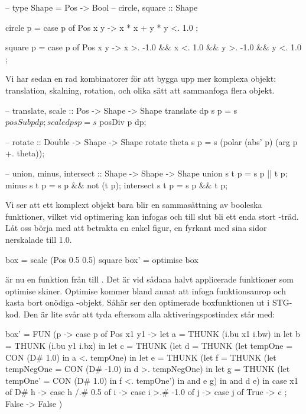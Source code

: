 \documentclass[Rapport]{subfiles}
\begin{document}
\begin{codeEx}
-- type Shape = Pos -> Bool
-- circle, square :: Shape

circle p = case p of
    { Pos x y -> x * x + y * y <. 1.0
    };

square p = case p of
    { Pos x y -> x >. -1.0 && x <. 1.0
              && y >. -1.0 && y <. 1.0
    };
\end{codeEx}

Vi har sedan en rad kombinatorer för att bygga upp mer komplexa objekt:
translation, skalning, rotation, och olika sätt att sammanfoga flera objekt.

\begin{codeEx}
-- translate, scale :: Pos -> Shape -> Shape
translate dp s p = s $ posSub p dp;
scale     dp s p = s $ posDiv p dp;

-- rotate :: Double -> Shape -> Shape
rotate theta s p = s (polar (abs' p) (arg p +. theta));

-- union, minus, intersect :: Shape -> Shape -> Shape
union     s t p = s p || t p;
minus     s t p = s p && not (t p);
intersect s t p = s p && t p;
\end{codeEx}

Vi ser att ett komplext objekt bara blir en sammasättning av booleska 
funktioner, vilket vid optimering kan infogas och till slut bli ett enda stort -träd. 
Låt oss börja med att betrakta en enkel figur, en fyrkant med sina sidor
nerskalade till 1.0.

\begin{codeEx}
box  = scale (Pos 0.5 0.5) square
box' = optimise box
\end{codeEx}

 är nu en funktion från  till . Det är vid sådana halvt applicerade funktioner
som optimise skiner. Optimise kommer bland annat att infoga funktionsanrop och kasta bort onödiga -objekt. 
Såhär ser den optimerade boxfunktionen ut i STG-kod. Den är lite svår att tyda 
eftersom alla aktiveringspostindex står med:

\begin{codeEx}
  box' = FUN (p -> case p of
     { Pos x1 y1 -> let
         { a = THUNK (i.bu x1 i.bw)
         } in let
           { b = THUNK (i.bu y1 i.bx)
           } in let
             { c = THUNK  (let
                 { d = THUNK (let
                     { tempOne = CON (D# 1.0)
                     } in a <. tempOne)
                 } in let
                   { e = THUNK (let
                       { f = THUNK (let
                           { tempNegOne = CON (D# -1.0)
                           } in d >. tempNegOne)
                       } in let
                         { g = THUNK (let
                             { tempOne' = CON (D# 1.0)
                             } in f <. tempOne')
                         } in and e g)
                   } in and d e)
             } in case x1 of
               { D# h -> case h /.# 0.5 of
                   { i -> case i >.# -1.0 of
                       { j -> case j of
                           { True  -> c
                           ; False  -> False
                           }
                       }
                   }
               }
     })
\end{codeEx}
\end{document}
